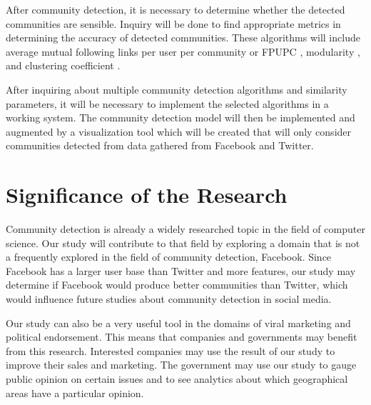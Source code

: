 After community detection, it is necessary to determine whether the detected communities are sensible. Inquiry will be done to find appropriate metrics in determining the accuracy of detected communities. These algorithms will include average mutual following links per user per community or FPUPC \cite{Zhang:2012}, modularity \cite{Deitrick:2013}, and clustering coefficient \cite{Lim:2012:1}.

After inquiring about multiple community detection algorithms and similarity parameters, it will be necessary to implement the selected algorithms in a working system. The community detection model will then be implemented and augmented by a visualization tool which will be created that will only consider communities detected from data gathered from Facebook and Twitter.

\section{Significance of the Research}
\label{sec:significance}

Community detection is already a widely researched topic in the field of computer science. Our study will contribute to that field by exploring a domain that is not a frequently explored in the field of community detection, Facebook. Since Facebook has a larger user base than Twitter and more features, our study may determine if Facebook would produce better communities than Twitter, which would influence future studies about community detection in social media.

Our study can also be a very useful tool in the domains of viral marketing and political endorsement. This means that companies and governments may benefit from this research. Interested companies may use the result of our study to improve their sales and marketing. The government may use our study to gauge public opinion on certain issues and to see analytics about which geographical areas have a particular opinion. 





